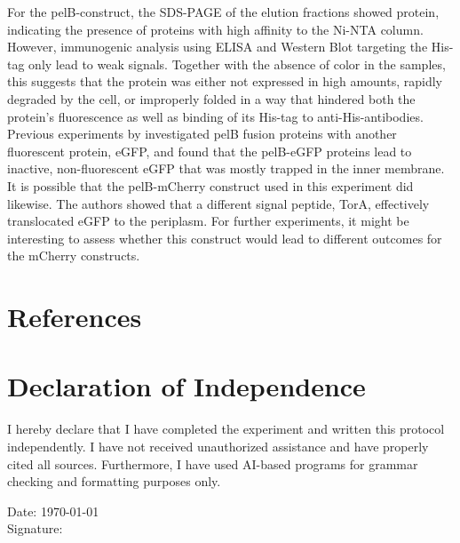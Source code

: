 \documentclass[a4paper,12pt]{article}
\begin{document}
For the pelB-construct, the SDS-PAGE of the elution fractions showed protein, indicating the presence of proteins with high affinity to the Ni-NTA column. However, immunogenic analysis using ELISA and Western Blot targeting the His-tag only lead to weak signals. Together with the absence of color in the samples, this suggests that the protein was either not expressed in high amounts, rapidly degraded by the cell, or improperly folded in a way that hindered both the protein's fluorescence as well as binding of its His-tag to anti-His-antibodies. Previous experiments by \cite{linton2012translocation} investigated pelB fusion proteins with another fluorescent protein, eGFP, and found that the pelB-eGFP proteins lead to inactive, non-fluorescent eGFP that was mostly trapped in the inner membrane. It is possible that the pelB-mCherry construct used in this experiment did likewise. The authors showed that a different signal peptide, TorA, effectively translocated eGFP to the periplasm. For further experiments, it might be interesting to assess whether this construct would lead to different outcomes for the mCherry constructs.


\section{References}
\printbibliography[heading=none]


\newpage
\section*{Declaration of Independence}
I hereby declare that I have completed the experiment and written this protocol independently. I have not received unauthorized assistance and have properly cited all sources. Furthermore, I have used AI-based programs for grammar checking and formatting purposes only.

Date: \today \\
Signature: \underline{\hspace{5cm}}
\end{document}
